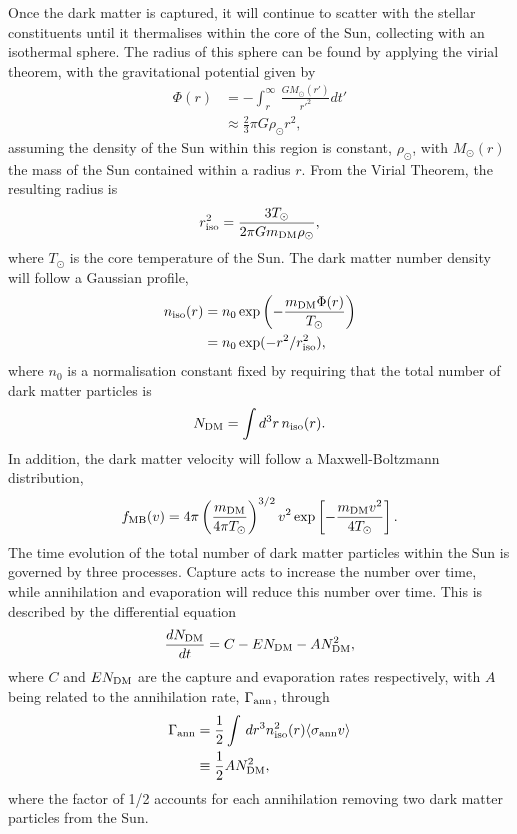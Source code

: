 Once the dark matter is captured, it will continue to scatter with the stellar constituents until it thermalises within the core of the Sun, collecting with an isothermal sphere. The radius of this sphere can be found by applying the virial theorem, with the gravitational potential given by
\begin{align}
    \Phi(r) & = -\int_r^\infty \,\frac{G M_\odot(r')}{r'^2}dt'\\
    &\approx \frac{2}{3}\pi G \rho_{\odot} r^2,
\end{align}
assuming the density of the Sun within this region is constant, $\rho_{\odot}$, with $M_\odot(r)$ the mass of the Sun contained within a radius $r$. From the Virial Theorem, the resulting radius is
\begin{equation}
    r_\mathrm{iso}^2 = \frac{3 T_\odot}{2\pi G m_\mathrm{DM} \rho_\odot},
\end{equation}
where $T_\odot$ is the core temperature of the Sun. The dark matter number density will follow a Gaussian profile, 
\begin{align}
    n_\mathrm{iso}(r) &= n_0\exp\left( - \frac{m_\mathrm{DM} \Phi(r)}{T_\odot}\right)\\
     & = n_0 \exp(-r^2/r_\mathrm{iso}^2),
\end{align}
where $n_0$ is a normalisation constant fixed by requiring that the total number of dark matter particles is 
\begin{equation}
    N_\mathrm{DM} = \int d^3 r\, n_\mathrm{iso}(r).
\end{equation}
In addition, the dark matter velocity will follow a Maxwell-Boltzmann distribution, 
\begin{equation}
    f_{\rm MB}(v) = 4\pi\left(\frac{m_\mathrm{DM}}{4\pi T_\odot}\right)^{3/2}v^2\exp\left[-\frac{m_\mathrm{DM} v^2}{4 T_\odot}\right].
\end{equation}
%
The time evolution of the total number of dark matter particles within the Sun is governed by three processes. Capture acts to increase the number over time, while annihilation and evaporation will reduce this number over time. This is described by the differential equation
\begin{equation}
    \frac{d N_\mathrm{DM}}{dt} = C  - E N_\mathrm{DM}- A N_\mathrm{DM}^2,
    \label{ch1:eq:DM_num_Sun}
\end{equation}
where $C$ and $E N_\mathrm{DM}$ are the capture and evaporation rates respectively, with $A$ being related to the annihilation rate, $\Gamma_\mathrm{ann}$, through
\begin{align}
    \Gamma_\mathrm{ann} & = \frac{1}{2}\int\,dr^3 n_\mathrm{iso}^2(r) \langle \sigma_{\rm ann} v \rangle\\
    & \equiv \frac{1}{2}A N_\mathrm{DM}^2,
\end{align}
where the factor of 1/2 accounts for each annihilation removing two dark matter particles from the Sun. 

